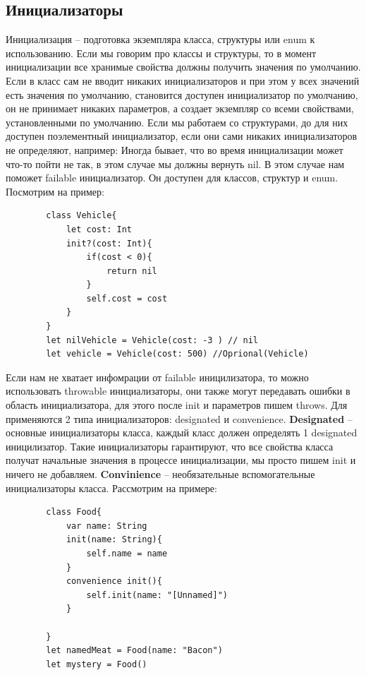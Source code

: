 \documentclass{article}
\begin{document}
    \subsection{Инициализаторы}
    Инициализация -- подготовка экземпляра класса, структуры или enum к использованию. 
    \newline
    Если мы говорим про классы и структуры, то в момент инициализации все хранимые свойства должны получить значения по умолчанию. Если в класс сам не вводит никаких инициализаторов и при этом у всех значений есть значения по умолчанию, становится доступен инициализатор по умолчанию, он не принимает никаких параметров, а создает экземпляр со всеми свойствами, установленными по умолчанию. 
    \newline
    Если мы работаем со структурами, до для них доступен поэлементный инициализатор, если они сами никаких инициализаторов не определяют, например:
    \newline
    \newline
    Иногда бывает, что во время инициализации может что-то пойти не так, в этом случае мы должны вернуть nil. В этом случае нам поможет failable инициализатор. Он доступен для классов, структур и enum. Посмотрим на пример: 
    \begin{verbatim}
        class Vehicle{
            let cost: Int
            init?(cost: Int){
                if(cost < 0){
                    return nil
                }
                self.cost = cost
            }
        }
        let nilVehicle = Vehicle(cost: -3 ) // nil
        let vehicle = Vehicle(cost: 500) //Oprional(Vehicle)
    \end{verbatim}
    Если нам не хватает инфомрации от failable иницилизатора, то можно использовать throwable инициализаторы, они также могут передавать ошибки в область инициализатора, для этого после init и параметров пишем throws. 
    \newline
    Для  применяются 2 типа инициализаторов: designated и convenience. 
    \newline
    \textbf{Designated} -- основные инициализаторы класса, каждый класс должен определять 1 designated иницилизатор. Такие инициализаторы гарантируют, что все свойства класса получат начальные значения в процессе инициализации, мы просто пишем init и ничего не добавляем. 
    \newline
    \textbf{Convinience} -- необязательные вспомогательные инициализаторы класса. Рассмотрим на примере: 
    \begin{verbatim}
        class Food{
            var name: String
            init(name: String){
                self.name = name
            }
            convenience init(){
                self.init(name: "[Unnamed]")
            }
                
        }
        let namedMeat = Food(name: "Bacon")
        let mystery = Food()
        
    \end{verbatim}
\end{document}
